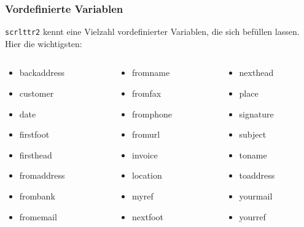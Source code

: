 \documentclass[12pt,ngerman]{beamer}
\begin{document}
\begin{frame}
\frametitle{Vordefinierte Variablen}

\texttt{scrlttr2} kennt eine Vielzahl vordefinierter Variablen, die sich befüllen lassen. Hier die wichtigsten: \vspace*{1em}

\begin{columns}
\begin{column}{0.3\textwidth}
\begin{itemize}
	\item backaddress
	\item customer
	\item date
	\item firstfoot
	\item firsthead
	\item fromaddress
	\item frombank
	\item fromemail
	\end{itemize}
\end{column}
\begin{column}{0.3\textwidth}
\begin{itemize}
	\item fromname
	\item fromfax
	\item fromphone
	\item fromurl
	\item invoice
	\item location
	\item myref
	\item nextfoot
	\end{itemize}
\end{column}
\begin{column}{0.3\textwidth}
\begin{itemize}
	\item nexthead
	\item place
	\item signature
	\item subject
	\item toname
	\item toaddress
	\item yourmail
	\item yourref
	\end{itemize}
\end{column}

\end{columns}

\end{frame}
\end{document}
